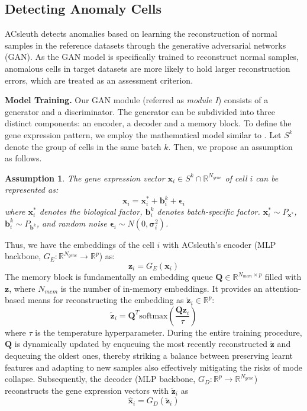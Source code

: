 \documentclass{article}
\newtheorem{assumption}{Assumption}[section]
\begin{document}
\subsection{Detecting Anomaly Cells}
ACsleuth detects anomalies based on learning the reconstruction of normal 
samples in the reference datasets through the generative adversarial networks (GAN). 
As the GAN model is specifically trained to reconstruct normal samples, 
anomalous cells in target datasets are more likely to hold larger reconstruction errors, 
which are treated as an assessment criterion. 

\textbf{Model Training.} Our GAN module (referred as \textit{module I}) consists of a generator and a discriminator. 
The generator can be subdivided into three distinct components: an encoder, a decoder and a memory block.
To define the gene expression pattern, we employ the mathematical model similar to \cite{hornung2016combining}.
Let $S^k$ denote the group of cells in the same batch $k$.
Then, we propose an assumption as follows.
\begin{assumption}\label{as:pattern}
    The gene expression vector $\bm{x}_i \in S^k \cap \mathbb{R}^{N_{gene}}$ of cell $i$ can be represented as:
    \begin{equation}\label{eq:pattern}
        \bm{x}_i = \bm{x}_i^* + \bm{b}_i^k + \bm{\epsilon}_i
    \end{equation}
    where $\bm{x}_i^*$ denotes the biological factor, $\bm{b}_i^k$ denotes batch-specific factor.
    $\bm{x}_i^* \sim P_{\bm{x}^*}$, $\bm{b}_i^k \sim P_{\bm{b}^k}$, and random noise $\bm{\epsilon}_i\sim N(0, \bm{\sigma}_i^2)$.
\end{assumption}
Thus, we have the embeddings of the cell $i$ with ACsleuth's encoder (MLP backbone, $G_E:\mathbb{R}^{N_{gene}} \rightarrow \mathbb{R}^p$) as:
\begin{equation}
    \bm{z}_i = G_E(\bm{x}_i)
\end{equation}
The memory block is fundamentally an embedding queue $\bm{Q}\in\mathbb{R}^{N_{mem}\times p}$ 
filled with $\bm{z}$, where $N_{mem}$ is the number of in-memory embeddings.
It provides an attention-based means for reconstructing the embedding as $\widetilde{\bm{z}}_i \in \mathbb{R}^p$: 
\begin{equation}
    \widetilde{\bm{z}}_i = \bm{Q}^T \text{softmax}\left(\frac{\bm{Q}\bm{z}_i}{\tau}\right)
\end{equation}
where $\tau$ is the temperature hyperparameter.
During the entire training procedure, $\bm{Q}$ is dynamically updated by enqueuing the most recently 
reconstructed $\widetilde{\bm{z}}$ and dequeuing the oldest ones, thereby striking 
a balance between preserving learnt features and adapting to new samples also 
effectively mitigating the risks of mode collapse. 
Subsequently, the decoder (MLP backbone, $G_D:\mathbb{R}^p \rightarrow \mathbb{R}^{N_{gene}}$) reconstructs the gene expression vectors 
with $\widetilde{\bm{z}}_i$ as
\begin{equation}
    \widehat{\bm{x}}_i = G_D(\widetilde{\bm{z}}_i)
\end{equation}
\end{document}
